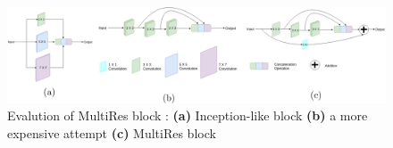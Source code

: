 \begin{figure}
    \centerline{\includegraphics[width=1\columnwidth]{04-methodology/figures/multiresunet-multiresblock-steps.jpg}}
    \caption{Evalution of MultiRes block : \textbf{(a)} Inception-like block \textbf{(b)} a more expensive attempt \textbf{(c)} MultiRes block \cite{ibtehaz2020multiresunet}}
    \label{figure:multiresunet-multiresblock-steps}
\end{figure}